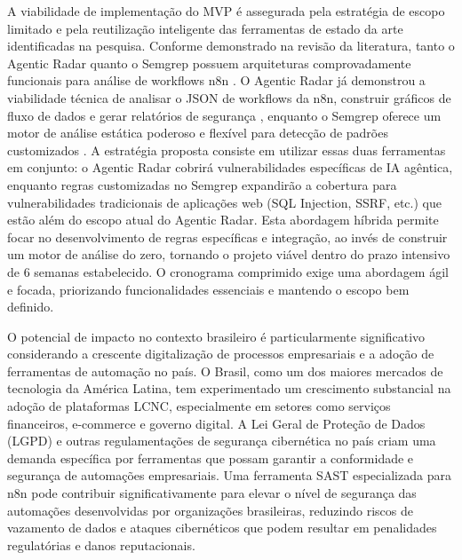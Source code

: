 \documentclass{sftex}
\begin{document}
A viabilidade de implementação do MVP é assegurada pela estratégia de escopo limitado e pela reutilização inteligente das ferramentas de estado da arte identificadas na pesquisa. Conforme demonstrado na revisão da literatura, tanto o Agentic Radar quanto o Semgrep possuem arquiteturas comprovadamente funcionais para análise de workflows n8n \cite{splxai_n8n_scanning}. O Agentic Radar já demonstrou a viabilidade técnica de analisar o JSON de workflows da n8n, construir gráficos de fluxo de dados e gerar relatórios de segurança \cite{splxai_medium_scanning}, enquanto o Semgrep oferece um motor de análise estática poderoso e flexível para detecção de padrões customizados \cite{semgrep_platform}. A estratégia proposta consiste em utilizar essas duas ferramentas em conjunto: o Agentic Radar cobrirá vulnerabilidades específicas de IA agêntica, enquanto regras customizadas no Semgrep expandirão a cobertura para vulnerabilidades tradicionais de aplicações web (SQL Injection, SSRF, etc.) que estão além do escopo atual do Agentic Radar. Esta abordagem híbrida permite focar no desenvolvimento de regras específicas e integração, ao invés de construir um motor de análise do zero, tornando o projeto viável dentro do prazo intensivo de 6 semanas estabelecido. O cronograma comprimido exige uma abordagem ágil e focada, priorizando funcionalidades essenciais e mantendo o escopo bem definido.

O potencial de impacto no contexto brasileiro é particularmente significativo considerando a crescente digitalização de processos empresariais e a adoção de ferramentas de automação no país. O Brasil, como um dos maiores mercados de tecnologia da América Latina, tem experimentado um crescimento substancial na adoção de plataformas LCNC, especialmente em setores como serviços financeiros, e-commerce e governo digital. A Lei Geral de Proteção de Dados (LGPD) e outras regulamentações de segurança cibernética no país criam uma demanda específica por ferramentas que possam garantir a conformidade e segurança de automações empresariais. Uma ferramenta SAST especializada para n8n pode contribuir significativamente para elevar o nível de segurança das automações desenvolvidas por organizações brasileiras, reduzindo riscos de vazamento de dados e ataques cibernéticos que podem resultar em penalidades regulatórias e danos reputacionais.
\end{document}
